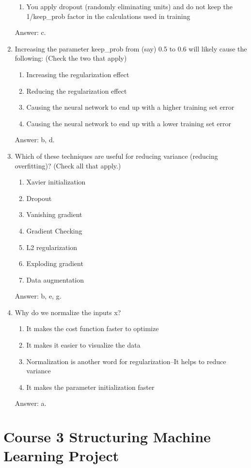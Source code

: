 \documentclass[12pt]{article}
\numberwithin{equation}{section}
\begin{document}
\begin{enumerate}
\begin{enumerate}
		\item You apply dropout (randomly eliminating units) and do not keep the 1/keep\_prob factor in the calculations used in training
	\end{enumerate}\par
	Answer: c.
	\item Increasing the parameter keep\_prob from (say) 0.5 to 0.6 will likely cause the following: (Check the two that apply)
	\begin{enumerate}
		\item Increasing the regularization effect
		\item Reducing the regularization effect
		\item Causing the neural network to end up with a higher training set error
		\item Causing the neural network to end up with a lower training set error
	\end{enumerate}\par
	Answer: b, d.
	\item Which of these techniques are useful for reducing variance (reducing overfitting)? (Check all that apply.)
	\begin{enumerate}
		\item Xavier initialization
		\item Dropout
		\item Vanishing gradient
		\item Gradient Checking
		\item L2 regularization
		\item Exploding gradient
		\item Data augmentation
	\end{enumerate}\par
	Answer: b, e, g.
	\item Why do we normalize the inputs x?
	\begin{enumerate}
		\item It makes the cost function faster to optimize
		\item It makes it easier to visualize the data
		\item Normalization is another word for regularization--It helps to reduce variance
		\item It makes the parameter initialization faster
	\end{enumerate}\par
	Answer: a.	
\end{enumerate}
\section{Course 3 Structuring Machine Learning Project} 
\end{document}
